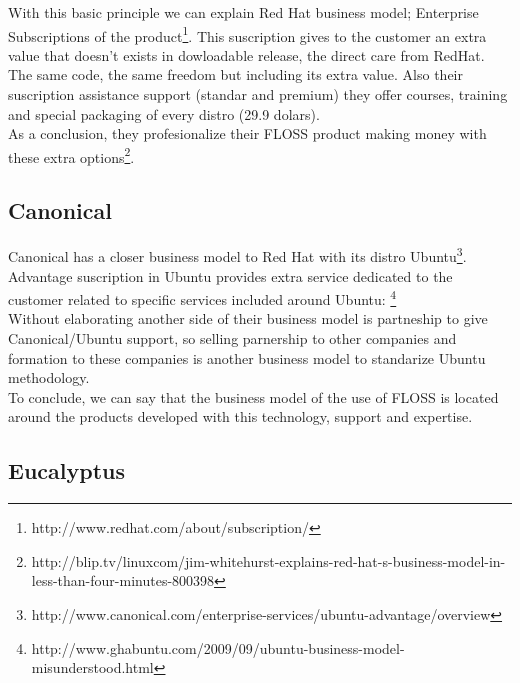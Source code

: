 \documentclass[11pt]{scrartcl}
\begin{document}
 With this basic principle we can explain Red Hat business model; Enterprise 
 Subscriptions of the product\footnote{http://www.redhat.com/about/subscription/}. 
 This suscription gives to the customer an extra value that doesn't exists
  in dowloadable release, the direct care from RedHat.\\
 The same code, the same freedom but including its extra value. Also their 
 suscription assistance support (standar and premium) they offer courses,
  training and special packaging of every distro (29.9 dolars).\\
 As a conclusion, they profesionalize their FLOSS product making money with 
 these extra options\footnote{http://blip.tv/linuxcom/jim-whitehurst-explains-red-hat-s-business-model-in-less-than-four-minutes-800398}.

\subsection{Canonical}

 Canonical has a closer business model to Red Hat with its distro Ubuntu\footnote{http://www.canonical.com/enterprise-services/ubuntu-advantage/overview}.
 Advantage suscription in Ubuntu provides extra service dedicated to the customer 
 related to specific services included around Ubuntu:
 \footnote{http://www.ghabuntu.com/2009/09/ubuntu-business-model-misunderstood.html}\\
 Without elaborating another side of their business model is partneship to give
 Canonical/Ubuntu support, so selling parnership to other companies and formation
 to these companies is another business model to standarize Ubuntu methodology.\\
 To conclude, we can say that the business model of the use of FLOSS is located
  around the products developed with this technology, support and expertise.
 
\subsection{Eucalyptus}
\end{document}
